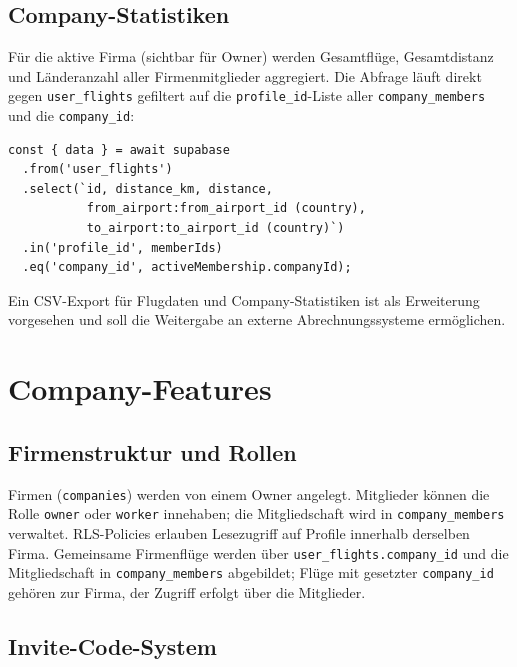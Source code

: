 \subsection{Company-Statistiken}

Für die aktive Firma (sichtbar für Owner) werden Gesamtflüge, Gesamtdistanz und
Länderanzahl aller Firmenmitglieder aggregiert. Die Abfrage läuft direkt gegen
\texttt{user\_flights} gefiltert auf die \texttt{profile\_id}-Liste aller \texttt{company\_members} und die
\texttt{company\_id}:

\begin{lstlisting}[style=skyline-ts,caption={Company-Statistiken (Auszug app/company/index.tsx)},label={lst:company_stats}]
const { data } = await supabase
  .from('user_flights')
  .select(`id, distance_km, distance,
           from_airport:from_airport_id (country),
           to_airport:to_airport_id (country)`)
  .in('profile_id', memberIds)
  .eq('company_id', activeMembership.companyId);
\end{lstlisting}

Ein CSV-Export für Flugdaten und Company-Statistiken ist als Erweiterung vorgesehen und soll die Weitergabe an externe Abrechnungssysteme ermöglichen.

\section{Company-Features}

\subsection{Firmenstruktur und Rollen}

Firmen (\texttt{companies}) werden von einem Owner angelegt. Mitglieder können die Rolle
\texttt{owner} oder \texttt{worker} innehaben; die Mitgliedschaft wird in \texttt{company\_members}
verwaltet. RLS-Policies erlauben Lesezugriff auf Profile innerhalb derselben Firma.
Gemeinsame Firmenflüge werden über \texttt{user\_flights.company\_id} und die Mitgliedschaft in \texttt{company\_members} abgebildet; Flüge mit gesetzter \texttt{company\_id} gehören zur Firma, der Zugriff erfolgt über die Mitglieder.

\subsection{Invite-Code-System}

